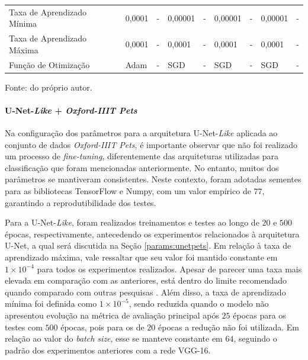 \begin{table}[H]
{\begin{tabular}{l|l|l|l|l|l|l|l|l}
        Taxa de Aprendizado Mínima                   & 0,0001                             & -                       & 0,00001                            & -                       & 0,00001                            & -                       & 0,00001                            & -                                                                  \\
        Taxa de Aprendizado Máxima                   & 0,0001                             & -                       & 0,0001                             & -                       & 0,0001                             & -                       & 0,0001                             & -                                                                  \\
        Função de Otimização                         & Adam                               & -                       & SGD                                & -                       & SGD                                & -                       & SGD                                & -                       
    \end{tabular}
    }

\vspace*{1 cm}
Fonte: do próprio autor.
\end{table}


\paragraph{U-Net-\textit{Like} + \textit{Oxford-IIIT Pets}}
\label{params:unetlikepets}
Na configuração dos parâmetros para a arquitetura U-Net-\textit{Like} aplicada ao conjunto de dados \textit{Oxford-IIIT Pets}, é importante observar que não foi realizado um processo de \textit{fine-tuning}, diferentemente das arquiteturas utilizadas para classificação que foram mencionadas anteriormente. No entanto, muitos dos parâmetros se mantiveram consistentes. Neste contexto, foram adotadas sementes para as bibliotecas TensorFlow e Numpy, com um valor empírico de $77$, garantindo a reprodutibilidade dos testes.

Para a U-Net-\textit{Like}, foram realizados treinamentos e testes ao longo de $20$ e $500$ épocas, respectivamente, antecedendo os experimentos relacionados à arquitetura U-Net, a qual será discutida na Seção \ref{params:unetpets}. Em relação à taxa de aprendizado máxima, vale ressaltar que seu valor foi mantido constante em $1 \times 10^{-4}$ para todos os experimentos realizados. Apesar de parecer uma taxa mais elevada em comparação com as anteriores, está dentro do limite recomendado quando comparado com outras pesquisas \citep{Fajar2023CyclicalSegmentation}. Além disso, a taxa de aprendizado mínima foi definida como $1 \times 10^{-5}$, sendo reduzida quando o modelo não apresentou evolução na métrica de avaliação principal após $25$ épocas para os testes com $500$ épocas, pois para os de $20$ épocas a redução não foi utilizada. Em relação ao valor do \textit{batch size}, esse se manteve constante em $64$, seguindo o padrão dos experimentos anteriores com a rede VGG-16.

